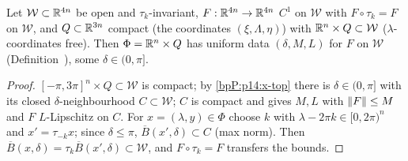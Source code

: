 \begin{lemma}\label{bpP:p14:uniform-data}
Let $\mathcal W\subset\mathbb{R}^{4n}$ be open and $\tau_k$-invariant, $F:\mathbb{R}^{4n}\to\mathbb{R}^{4n}$ $C^1$ on $\mathcal W$ with $F\circ\tau_k=F$ on $\mathcal W$, and $Q\subset\mathbb{R}^{3n}$ compact (the coordinates $(\xi,\Lambda,\eta)$) with $\mathbb{R}^n\times Q\subset\mathcal W$ ($\lambda$-coordinates free). Then $\Phi=\mathbb{R}^n\times Q$ has uniform data $(\delta,M,L)$ for $F$ on $\mathcal W$ (Definition~), some $\delta\in(0,\pi]$.
\end{lemma}
\begin{proof}
\label{stepP:p14:ud-cell} $[-\pi,3\pi]^n\times Q\subset\mathcal W$ is compact; by \ref{bpP:p14:x-top} there is $\delta\in(0,\pi]$ with its closed $\delta$-neighbourhood $C\subset\mathcal W$; $C$ is compact and  gives $M,L$ with $\lVert F\rVert\le M$ and $F$ $L$-Lipschitz on $C$.
\label{stepP:p14:ud-transl} For $x=(\lambda,y)\in\Phi$ choose $k$ with $\lambda-2\pi k\in[0,2\pi)^n$ and $x'=\tau_{-k}x$; since $\delta\le\pi$, $\overline B(x',\delta)\subset C$ (max norm). Then $\overline B(x,\delta)=\tau_k\overline B(x',\delta)\subset\mathcal W$, and $F\circ\tau_k=F$ transfers the bounds.
\end{proof}

